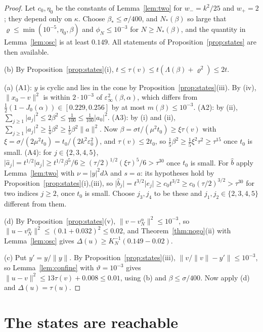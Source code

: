 \documentclass[11pt]{article}
\theoremstyle{definition}
\newcommand{\norm}[1]{\lVert #1\rVert}
\newcommand{\abs}[1]{\lvert #1\rvert}
\newcommand{\ha}{\hat a}
\newcommand{\hb}{\hat b}
\newcommand{\rhoN}{\varrho}
\begin{document}
\begin{proof}
Let $c_0,\eta_0$ be the constants of Lemma~\ref{lem:two} for $w_-=k^2/25$ and $w_+=2$; they
depend only on $\kappa$. Choose $\beta_*\le\sigma/400$, and $N_*(\beta)$ so large that
$\rhoN\le\min(10^{-5},\eta_0,\beta)$ and $\phi_N\le10^{-3}$ for $N\ge N_*(\beta)$, and the
quantity in Lemma~\ref{lem:osc} is at least $0.149$. All statements of
Proposition~\ref{prop:states} are then available.

(b) By Proposition~\ref{prop:states}(i), $t\le\tau(v)\le t(\Lambda(\beta)+\rhoN^2)\le2t$.

(a) (A1): $y$ is cyclic and lies in the cone by Proposition~\ref{prop:states}(iii). By (iv),
$\norm{x_0-v}^2$ is within $2\cdot10^{-3}$ of $\varepsilon_\infty^2(\beta,\alpha)$, which
differs from $\frac12(1-J_0(\alpha))\in[0.229,0.256]$ by at most $m(\beta)\le10^{-3}$.
(A2): by (ii), $\sum_{j\ge1}\abs{a_j}^2\le2\beta^2\le\frac1{100}\le\frac1{100}\abs{a_0}^2$.
(A3): by (i) and (ii), $\sum_{j\ge1}\abs{a_j}^2\ge\frac14\beta^2\ge\frac15\beta^2\norm a^2$.
Now $\beta=\sigma t/(\mu^2t_0)\ge\xi\tau(v)$ with
$\xi=\sigma/(2\mu^2t_0)=t_0/(2k^2\varepsilon_0^2)$, and $\tau(v)\le2t_0$, so
$\frac15\beta^2\ge\frac15\xi^2\tau^2\ge\tau^{15}$ once $t_0$ is small.
(A4): for $j\in\{2,3,4,5\}$, $\abs{\ha_j}=t^{1/2}\abs{a_j}\ge t^{1/2}\beta^5/6\ge
(\tau/2)^{1/2}(\xi\tau)^5/6>\tau^{30}$ once $t_0$ is small. For $\hb$ apply
Lemma~\ref{lem:two} with $\nu=\abs y^2d\lambda$ and $s=a$: its hypotheses hold by
Proposition~\ref{prop:states}(i),(iii), so $\abs{\hb_j}=t^{3/2}\abs{e_j}\ge c_0t^{3/2}\ge
c_0(\tau/2)^{3/2}>\tau^{30}$ for two indices $j\ge2$, once $t_0$ is small. Choose $j_3,j_4$
to be these and $j_1,j_2\in\{2,3,4,5\}$ different from them.

(d) By
Proposition~\ref{prop:states}(v), $\norm{v-v_N^\alpha}^2\le10^{-3}$, so
$\norm{u-v_N^\alpha}^2\le(0.1+0.032)^2\le0.02$, and Theorem~\ref{thm:nogo}(ii) with
Lemma~\ref{lem:osc} gives $\Delta(u)\ge K_N^{-1}(0.149-0.02)$.

(c) Put $y'=y/\norm y$. By Proposition~\ref{prop:states}(iii),
$\norm{v/\norm v-y'}\le10^{-3}$, so Lemma~\ref{lem:confine} with $\vartheta=10^{-3}$ gives
$\norm{u-v}^2\le13\tau(v)+0.008\le0.01$, using (b) and $\beta\le\sigma/400$. Now apply (d)
and $\Delta(u)=\tau(u)$.
\end{proof}

\section{The states are reachable}\label{sec:reach}
\end{document}
